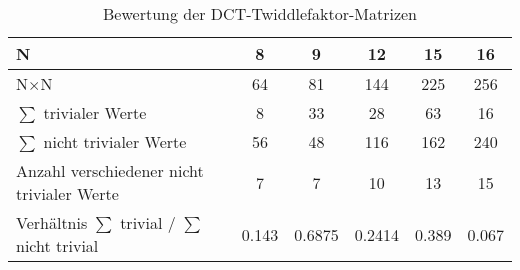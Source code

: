 \begingroup
  \renewcommand*{\arraystretch}{1.2} %
\begin{table}[ht!]
 \centering
 \caption{Bewertung der DCT-Twiddlefaktor-Matrizen}
 \begin{tabular}{lccccc}
   \hline  
   N                                                 & 8     & 9      & 12     & 15    & 16\\
   \hline
   N$\times$N                                        & 64    & 81     & 144    & 225   & 256\\
   \rowcolor{lightgray}
   $\sum$ trivialer Werte                            & 8     & 33     & 28     & 63    & 16\\
   \rowcolor{lightgray}
   $\sum$ nicht trivialer Werte                      & 56    & 48     & 116    & 162   & 240\\
   Anzahl verschiedener nicht trivialer Werte        & 7     & 7      & 10     & 13    & 15\\
   Verhältnis $\sum$ trivial / $\sum$ nicht trivial  & 0.143 & 0.6875 & 0.2414 & 0.389 & 0.067\\
   \hline
 \end{tabular}
 \label{tab:DCT-TwiddlefaktorMatrizenBewertung}  
\end{table}
\endgroup
